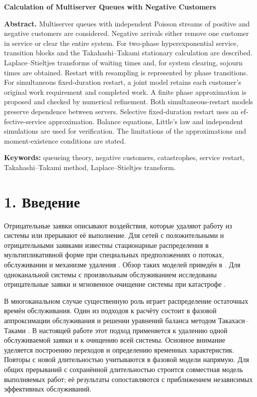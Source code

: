 \begin{otherlanguage}{english}
\bigskip
\begin{center}\textbf{Calculation of Multiserver Queues with Negative Customers}\end{center}
\textbf{Abstract.} Multiserver queues with independent Poisson streams of positive and negative customers are considered. Negative arrivals either remove one customer in service or clear the entire system. For two-phase hyperexponential service, transition blocks and the Takahashi--Takami stationary calculation are described. Laplace--Stieltjes transforms of waiting times and, for system clearing, sojourn times are obtained. Restart with resampling is represented by phase transitions. For simultaneous fixed-duration restart, a joint model retains each customer's original work requirement and completed work. A finite phase approximation is proposed and checked by numerical refinement. Both simultaneous-restart models preserve dependence between servers. Selective fixed-duration restart uses an effective-service approximation. Balance equations, Little's law and independent simulations are used for verification. The limitations of the approximations and moment-existence conditions are stated.

\textbf{Keywords:} queueing theory, negative customers, catastrophes, service restart, Takahashi--Takami method, Laplace--Stieltjes transform.
\end{otherlanguage}


\section*{1. Введение}
Отрицательные заявки описывают воздействия, которые удаляют работу из системы или прерывают её выполнение. Для сетей с положительными и отрицательными заявками известны стационарные распределения в мультипликативной форме при специальных предположениях о потоках, обслуживании и механизме удаления \cite{gelenbe1991,gelenbe1992}. Обзор таких моделей приведён в \cite{artalejo2000}. Для одноканальной системы с произвольным обслуживанием исследованы отрицательные заявки \cite{harrison1996} и мгновенное очищение системы при катастрофе \cite{jain1996}.

В многоканальном случае существенную роль играет распределение остаточных времён обслуживания. Один из подходов к расчёту состоит в фазовой аппроксимации обслуживания и решении уравнений баланса методом Такахаси--Таками \cite{takahashi1976,ryzhikov2018ru}. В настоящей работе этот подход применяется к удалению одной обслуживаемой заявки и к очищению всей системы. Основное внимание уделяется построению переходов и определению временных характеристик. Повторы с новой длительностью учитываются в фазовой модели напрямую. Для общих прерываний с сохранённой длительностью строится совместная модель выполняемых работ; её результаты сопоставляются с приближением независимых эффективных обслуживаний.

